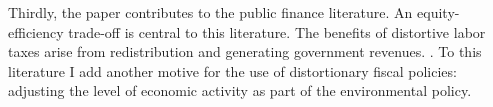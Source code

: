 Thirdly, the paper contributes to the public finance literature.
An equity-efficiency trade-off is central to this literature.  The benefits of distortive labor taxes arise from redistribution and generating government revenues. 
\citep{Heathcote2017OptimalFramework, Conesa2009TaxingAll, Domeij2004OnTaxes}.
To this literature I add another motive for the use of distortionary fiscal policies: adjusting the level of economic activity as part of the environmental policy. 

\begin{comment}

Finally, the paper relates from its motivation and finding to the discussion on whether production levels are inefficiently high. 
Other motives for the reduction of consumption arise from
envy \cite{Alvarez-Cuadrado2007EnvyHours}, or a positive externality of leisure \cite{Alesina2005WorkDifferent}. \cite{Arrow2004AreMuch} discuss whether there is a need to reduce consumption levels due to sustainability concerns. 
The present paper contributes to this literature by identifying another reason for too high labor supply. The externality results from mitigating an environmental externality and the absence of research subsidies.
\end{comment}